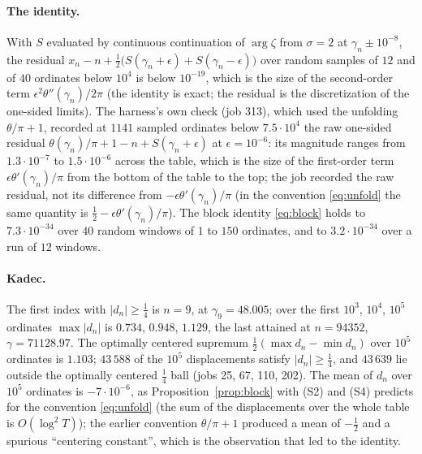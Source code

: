 \documentclass[11pt]{article}
\begin{document}
\paragraph{The identity.} With $S$ evaluated by continuous continuation of $\arg\zeta$ from $\sigma=2$ at $\gamma_n\pm10^{-8}$, the residual $x_n-n+\tfrac12\bigl(S(\gamma_n+\epsilon)+S(\gamma_n-\epsilon)\bigr)$ over random samples of $12$ and of $40$ ordinates below $10^4$ is below $10^{-19}$, which is the size of the second-order term $\epsilon^2\theta''(\gamma_n)/2\pi$ (the identity is exact; the residual is the discretization of the one-sided limits). The harness's own check (job 313), which used the unfolding $\theta/\pi+1$, recorded at $1141$ sampled ordinates below $7.5\cdot10^4$ the raw one-sided residual $\theta(\gamma_n)/\pi+1-n+S(\gamma_n+\epsilon)$ at $\epsilon=10^{-6}$: its magnitude ranges from $1.3\cdot10^{-7}$ to $1.5\cdot10^{-6}$ across the table, which is the size of the first-order term $\epsilon\theta'(\gamma_n)/\pi$ from the bottom of the table to the top; the job recorded the raw residual, not its difference from $-\epsilon\theta'(\gamma_n)/\pi$ (in the convention \eqref{eq:unfold} the same quantity is $\frac12-\epsilon\theta'(\gamma_n)/\pi$). The block identity \eqref{eq:block} holds to $7.3\cdot10^{-34}$ over $40$ random windows of $1$ to $150$ ordinates, and to $3.2\cdot10^{-34}$ over a run of $12$ windows.

\paragraph{Kadec.} The first index with $|d_n|\ge\frac14$ is $n=9$, at $\gamma_9=48.005$; over the first $10^3$, $10^4$, $10^5$ ordinates $\max|d_n|$ is $0.734$, $0.948$, $1.129$, the last attained at $n=94352$, $\gamma=71128.97$. The optimally centered supremum $\frac12(\max d_n-\min d_n)$ over $10^5$ ordinates is $1.103$; $43\,588$ of the $10^5$ displacements satisfy $|d_n|\ge\frac14$, and $43\,639$ lie outside the optimally centered $\frac14$ ball (jobs 25, 67, 110, 202). The mean of $d_n$ over $10^5$ ordinates is $-7\cdot10^{-6}$, as Proposition~\ref{prop:block} with (S2) and (S4) predicts for the convention \eqref{eq:unfold} (the sum of the displacements over the whole table is $O(\log^2T)$); the earlier convention $\theta/\pi+1$ produced a mean of $-\frac12$ and a spurious ``centering constant'', which is the observation that led to the identity.
\end{document}
